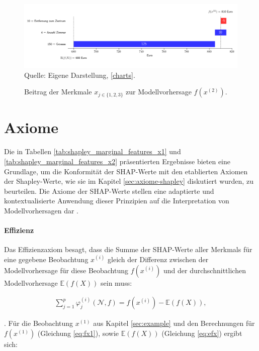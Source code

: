 \begin{figure}[!h]
    \caption{Beitrag der Merkmale $x_{j \in \{1, 2, 3\}}$ zur Modellvorhersage $f(x^{(2)})$.}
    \includegraphics[width=1\textwidth]{../scripts/images/model-output-x2.png}
    Quelle: Eigene Darstellung, \ref{charts}.
    \label{pic:model-fx2}
\end{figure}


\section{Axiome}

Die in Tabellen \ref{tab:shapley_marginal_features_x1} und \ref{tab:shapley_marginal_features_x2} präsentierten Ergebnisse bieten eine Grundlage, 
um die Konformität der SHAP-Werte mit den etablierten Axiomen der Shapley-Werte, wie sie im 
Kapitel \ref{sec:axiome-shapley} diskutiert wurden, zu beurteilen. Die Axiome der SHAP-Werte stellen 
eine adaptierte und kontextualisierte Anwendung dieser Prinzipien auf die Interpretation von 
Modellvorhersagen dar \cite[S. 16f]{Algaba2019HandbookOT}.


\paragraph{Effizienz}

Das Effizienzaxiom besagt, dass die Summe der SHAP-Werte aller Merkmals für eine gegebene Beobachtung $x^{(i)}$ 
gleich der Differenz zwischen der Modellvorhersage für diese Beobachtung $f(x^{(i)})$ 
und der durchschnittlichen Modellvorhersage $\mathbb{E}(f(X))$ sein muss:

\begin{align}
    \sum_{j=1}^{p}\varphi_j^{(i)}(\mathcal{N}, f) = f(x^{(i)}) - \mathbb{E}(f(X)),
    \label{eq:eff}
\end{align}

\cite[S. 221]{Molnar_2022}. Für die Beobachtung $x^{(1)}$ aus Kapitel \ref{sec:example} und den Berechnungen 
für $f(x^{(1)})$ (Gleichung \ref{eq:fx1}), sowie $\mathbb{E}(f(X))$ (Gleichung \ref{eq:efx}) ergibt sich:

